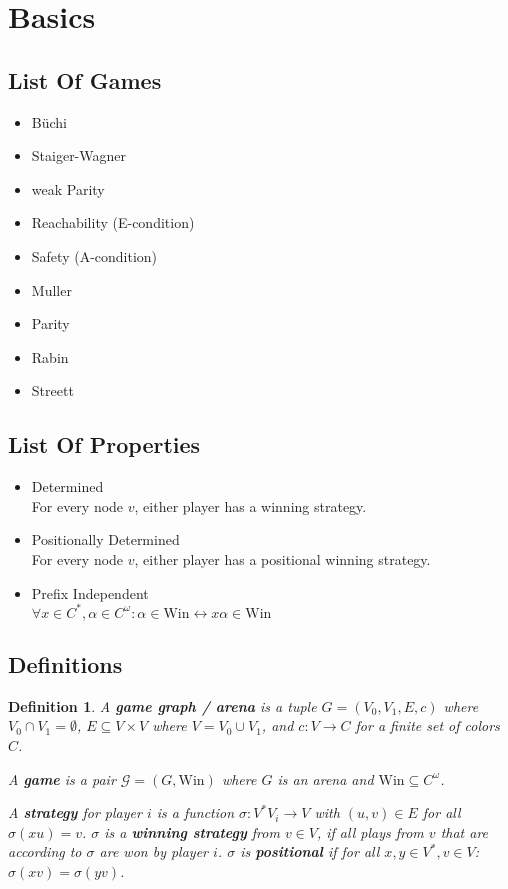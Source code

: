 \documentclass{article}
\newtheorem{definition}{Definition}
\begin{document}
\section{Basics}
\subsection{List Of Games}
\begin{itemize}
	\item Büchi
	\item Staiger-Wagner
	\item weak Parity
	\item Reachability (E-condition)
	\item Safety (A-condition)
	\item Muller
	\item Parity
	\item Rabin
	\item Streett
\end{itemize}

\subsection{List Of Properties}
\begin{itemize}
	\item Determined \\
		For every node $v$, either player has a winning strategy.
	\item Positionally Determined \\
		For every node $v$, either player has a positional winning strategy.
	\item Prefix Independent \\
		$\forall x \in C^*, \alpha \in C^\omega: \alpha \in \text{Win} \leftrightarrow x \alpha \in \text{Win}$
\end{itemize}

\subsection{Definitions}
\begin{definition}
	A \textbf{game graph / arena} is a tuple $G = (V_0, V_1, E, c)$ where $V_0 \cap V_1 = \emptyset$, $E \subseteq V \times V$ where $V = V_0 \cup V_1$, and $c : V \rightarrow C$ for a finite set of colors $C$.
	
	A \textbf{game} is a pair $\mathcal{G} = (G, \text{Win})$ where $G$ is an arena and $\text{Win} \subseteq C^\omega$.
	
	A \textbf{strategy} for player $i$ is a function $\sigma : V^* V_i \rightarrow V$ with $(u, v) \in E$ for all $\sigma(xu) = v$. $\sigma$ is a \textbf{winning strategy} from $v \in V$, if all plays from $v$ that are according to $\sigma$ are won by player $i$. $\sigma$ is \textbf{positional} if for all $x, y \in V^*, v \in V$: $\sigma(xv) = \sigma(yv)$.
\end{definition}
\end{document}
